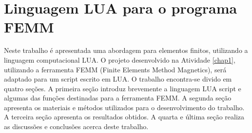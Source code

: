 \chapter{Linguagem LUA para o programa FEMM}
\label{chap2}
Neste trabalho é apresentada uma abordagem para elementos finitos, utilizando a linguagem computacional LUA. O projeto desenvolvido na Atividade \ref{chap1}, utilizando a ferramenta FEMM (Finite Elements Method Magnetics), será adaptado para um script escrito em LUA. O trabalho encontra-se divido em quatro seções. A primeira seção introduz brevemente a linguagem LUA script e algumas das funções destinadas para a ferramenta FEMM. A segunda seção apresenta os materiais e métodos utilizados para o desenvolvimento do trabalho. A terceira seção apresenta os resultados obtidos. A quarta e última seção realiza as discussões e conclusões acerca deste trabalho.
\newpage
\pagebreak




